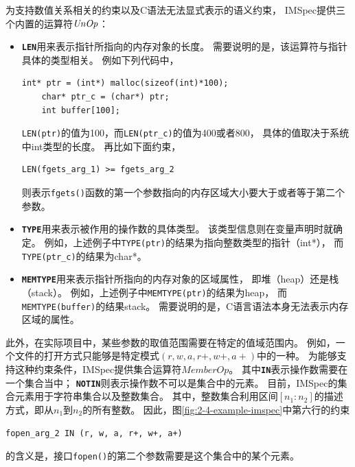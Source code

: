 为支持数值关系相关的约束以及C语法无法显式表示的语义约束，
IMSpec提供三个内置的运算符$\mathit{UnOp}$：
\begin{itemize}
	\item 
	\textbf{\texttt{LEN}}用来表示指针所指向的内存对象的长度。
	需要说明的是，该运算符与指针具体的类型相关。
	例如下列代码中，
	\begin{lstlisting}[language={[ANSI]C},
	basicstyle=\linespread{0.8}\listingsfont,
	numbers=none,
	xleftmargin=.15\textwidth]
	int* ptr = (int*) malloc(sizeof(int)*100);
	char* ptr_c = (char*) ptr;
	int buffer[100];
	\end{lstlisting}
	\texttt{LEN(ptr)}的值为100，而\texttt{LEN(ptr\_c)}的值为400或者800，
	具体的值取决于系统中int类型的长度。
	再比如下面约束，
	\begin{lstlisting}[language={[ANSI]C},
	basicstyle=\linespread{0.8}\listingsfont,
	numbers=none,
	xleftmargin=.15\textwidth]
	LEN(fgets_arg_1) >= fgets_arg_2
	\end{lstlisting}
	则表示\texttt{fgets()}函数的第一个参数指向的内存区域大小要大于或者等于第二个参数。
	\item 
	\textbf{\texttt{TYPE}}用来表示被作用的操作数的具体类型。
	该类型信息则在变量声明时就确定。
	例如，上述例子中\texttt{TYPE(ptr)}的结果为指向整数类型的指针（int*），
	而\texttt{TYPE(ptr\_c)}的结果为char*。
	\item 
	 \textbf{\texttt{MEMTYPE}}用来表示指针所指向的内存对象的区域属性，
	即堆（heap）还是栈（stack）。
	例如，上述例子中\texttt{MEMTYPE(ptr)}的结果为heap，
	而\texttt{MEMTYPE(buffer)}的结果stack。
	需要说明的是，C语言语法本身无法表示内存区域的属性。
\end{itemize}

此外，在实际项目中，某些参数的取值范围需要在特定的值域范围内。
例如，一个文件的打开方式只能够是特定模式$(r, w, a, r+, w+, a+)$中的一种。
为能够支持这种约束条件，IMSpec提供集合运算符$\mathit{MemberOp}$。
其中\texttt{\textbf{IN}}表示操作数需要在一个集合当中；
\texttt{\textbf{NOTIN}}则表示操作数不可以是集合中的元素。
目前，IMSpec的集合元素用于字符串集合以及整数集合。
其中，整数集合利用区间$[n_1:n_2]$的描述方式，即从$n_1$到$n_2$的所有整数。
因此，图\ref{fig:2-4-example-imspec}中第六行的约束
\begin{lstlisting}[language={[ANSI]C},
basicstyle=\linespread{0.8}\listingsfont,
numbers=none,
xleftmargin=.3\textwidth]
fopen_arg_2 IN (r, w, a, r+, w+, a+)
\end{lstlisting}
的含义是，接口\texttt{fopen()}的第二个参数需要是这个集合中的某个元素。


